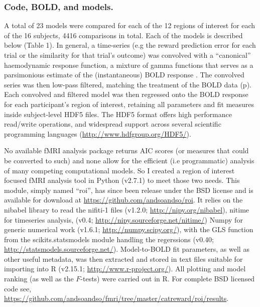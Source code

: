 \documentclass[doc,12pt]{apa}        %
\begin{document}
\subsubsection{Code, BOLD, and models.}
\label{sub:cmb}
A total of 23 models were compared for each of the 12 regions of interest for each of the 16 subjects, 4416 comparisons in total.  Each of the models is described below (Table 1).  In general, a time-series (e.g the reward prediction error for each trial or the similarity for that trial's outcome) was convolved with a ``canonical''  haemodynamic response function, a mixture of gamma functions that serves as a parsimonious estimate of the (instantaneous) BOLD response \cite{Friston:1998p2022}.  The convolved series was then low-pass filtered, matching the treatment of the BOLD data (p\pageref{subsub:preprocessed}).  Each convolved and filtered model was then regressed onto the BOLD response for each participant's region of interest, retaining all parameters and fit measures inside subject-level HDF5 files.  The HDF5 format offers high performance read/write operations, and widespread support across several scientific programming languages (\url{http://www.hdfgroup.org/HDF5/}).

No available fMRI analysis package returns AIC scores (or measures that could be converted to such) and none allow for the efficient (i.e programmatic) analysis of many competing computational models. So I created a region of interest focused fMRI analysis tool in Python (v2.7.1) to meet those two needs.  This module, simply named ``roi'', has since been release under the BSD license and is available for download at \url{https://github.com/andsoandso/roi}. It relies on the nibabel library to read the nifiti-1 files  (v1.2.0; \url{http://nipy.org/nibabel}), nitime for timeseries analysis, (v0.4; \url{http://nipy.sourceforge.net/nitime/}) Numpy for generic numerical work (v1.6.1; \url{http://numpy.scipy.org/}), with the GLS function from the scikits.statsmodels module handling the regerssions (v0.40; \url{http://statsmodels.sourceforge.net/}).  Model-to-BOLD fit parameters, as well as other useful metadata, was then extracted and stored in text files suitable for importing into R (v2.15.1; \url{http://www.r-project.org/}).  All plotting and model ranking (as well as the $F$-tests) were carried out in R.  For complete BSD licensed code see, \url{https://github.com/andsoandso/fmri/tree/master/catreward/roi/results}.
\end{document}
